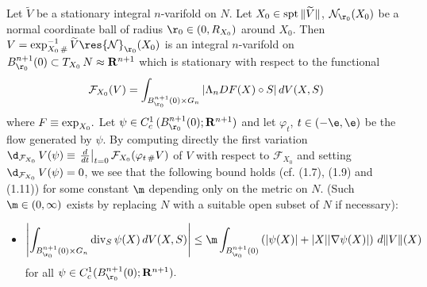 \documentclass[a4paper,11pt]{amsart}
\begin{document}
Let ${\widetilde V}$ be a  stationary integral $n$-varifold on $N$.  Let $X_{0} \in {\rm spt} \, \|\widetilde{V}\|$,  ${\mathcal N}_{\r_{0}}(X_{0})$ be a normal coordinate ball of radius $\r_{0} \in (0, R_{X_{0}})$ around $X_{0}.$ 
Then $V = {\rm exp}_{X_{0} \,\#}^{-1} \, \widetilde{V} \res {\mathcal N}_{\r_{0}}(X_{0})$ is an integral $n$-varifold on $B_{\r_{0}}^{n+1}(0) \subset T_{X_{0}} \, N \approx {\mathbf R}^{n+1}$ which is stationary with respect to the functional  
\begin{equation}\label{manifolds-0}
{\mathcal F}_{X_{0}} (V) = \int_{B_{\r_{0}}^{n+1}(0) \times G_{n}} |\Lambda_{n} DF(X) \circ S| \, dV(X, S)
\end{equation}
where $F \equiv {\rm exp}_{X_{0}}.$ Let $\psi \in C^{1}_{c} \, (B_{\r_{0}}^{n+1}(0); {\mathbf R}^{n+1})$ and let $\varphi_{t}$, $t \in (-\e,\e)$ be the flow generated by $\psi.$ By computing directly the first variation $\d_{{\mathcal F}_{X_{0}}} \, V(\psi) \equiv\left.\frac{d}{dt}\right|_{t=0} {\mathcal F}_{X_{0}}(\varphi_{t \,\#} V)$ of $V$ with respect to ${\mathcal F}_{X_{0}}$ and setting 
$\d_{{\mathcal F}_{X_{0}}} \, V (\psi) = 0$, we see that the following bound holds (cf. \cite{SS} (1.7), (1.9) and (1.11)) for some constant $\m$ depending only on the metric on $N.$ (Such $\m \in (0, \infty)$ exists by replacing $N$ with a suitable open subset of $N$ if necessary):
\begin{itemize}
\item[(${\mathcal S^{\star}{\emph 1}}$)] 
$$\left|\int_{B_{\r_{0}}^{n+1}(0) \times G_{n}} {\rm div}_{S} \, \psi(X) \, dV(X, S) \right| \leq \m\int_{B_{\r_{0}}^{n+1}(0)} \left(|\psi(X)| + |X||\nabla\psi(X)|\right) \, d\|V\|(X)$$
\noindent
for all $\psi \in C_{c}^{1}(B_{\r_{0}}^{n+1}(0); {\mathbf R}^{n+1}).$ 
\end{itemize}
\end{document}
